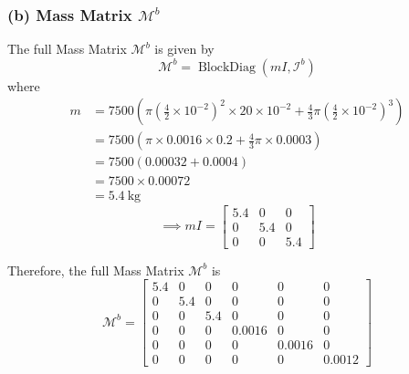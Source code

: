 \subsubsection*{(b) Mass Matrix \( \mathcal{M}^{b} \)}

The full Mass Matrix \( \mathcal{M}^{b} \) is given by
\begin{equation}
    \mathcal{M}^{b}=\operatorname{BlockDiag}\left(m I, \mathcal{I}^{b}\right)
\end{equation}
where
\begin{align*}
    m & =7500\left(\pi\left(\frac{4}{2} \times 10^{-2}\right)^{2} \times 20 \times 10^{-2}+\frac{4}{3} \pi\left(\frac{4}{2} \times 10^{-2}\right)^{3}\right) \\
      & =7500\left(\pi \times 0.0016 \times 0.2+\frac{4}{3} \pi \times 0.0003\right)                                                                         \\
      & =7500\left(0.00032+0.0004\right)                                                                                                                     \\
      & =7500 \times 0.00072                                                                                                                                 \\
      & =5.4 \mathrm{~kg}
\end{align*}
\begin{equation}
    \implies
    m I=\begin{bmatrix}
        5.4 & 0   & 0   \\
        0   & 5.4 & 0   \\
        0   & 0   & 5.4
    \end{bmatrix}
\end{equation}

Therefore, the full Mass Matrix \( \mathcal{M}^{b} \) is
\begin{equation}
    \mathcal{M}^{b}=\begin{bmatrix}
        5.4 & 0   & 0   & 0      & 0      & 0      \\
        0   & 5.4 & 0   & 0      & 0      & 0      \\
        0   & 0   & 5.4 & 0      & 0      & 0      \\
        0   & 0   & 0   & 0.0016 & 0      & 0      \\
        0   & 0   & 0   & 0      & 0.0016 & 0      \\
        0   & 0   & 0   & 0      & 0      & 0.0012
    \end{bmatrix}
\end{equation}

